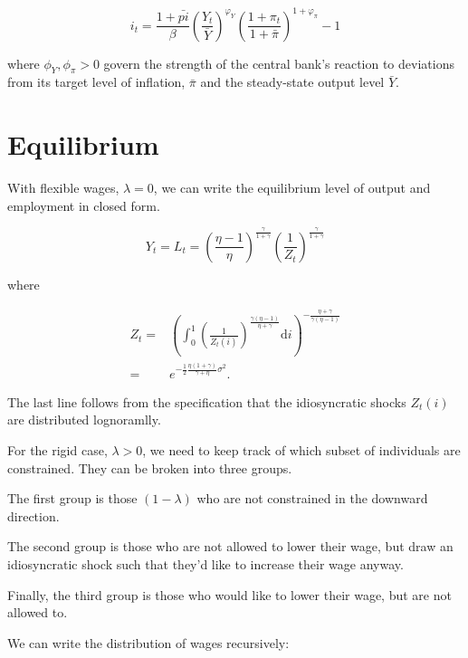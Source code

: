 \documentclass[12pt,a4paper]{scrartcl}            %
\begin{document}
\begin{equation}
    \label{eq:taylor_rule}
    i_t = \frac{1 + \bar{pi}}{\beta} \left( \frac{Y_t}{\bar{Y}} \right)^{\varphi_Y} \left( \frac{1 + \pi_t}{1 + \bar{\pi}} \right)^{1 + \varphi_{\pi}} - 1
\end{equation}

where $\phi_Y, \phi_{\pi} > 0$ govern the strength of the central bank's reaction to deviations from its target level of inflation, $\bar{\pi}$ and the steady-state output level $\bar{Y}$.

\section{Equilibrium}
\label{sec:equilibrium}

With flexible wages, $\lambda = 0$, we can write the equilibrium level of output and employment in closed form.

\begin{equation}
    \label{eq:output_flexible}
    Y_t = L_t = \left( \frac{\eta - 1}{\eta} \right)^{\frac{\gamma}{1 + \gamma}} \left( \frac{1}{Z_t} \right)^{\frac{\gamma}{1 + \gamma}}
\end{equation}

where

\begin{align}
    Z_t =& \left( \int_{0}^{1}\! \left( \frac{1}{Z_t(i)} \right)^{\frac{\gamma(\eta - 1)}{\eta + \gamma}} \mathrm{d}i \right)^{-\frac{\eta + \gamma}{\gamma(\eta - 1)}}\\
        =& e^{-\frac{1}{2} \frac{\eta(1 + \gamma)}{\gamma + \eta}\sigma^2 }.
\end{align}

The last line follows from the specification that the idiosyncratic shocks $Z_t(i)$ are distributed lognoramlly.

For the rigid case, $\lambda > 0$, we need to keep track of which subset of individuals are constrained.
They can be broken into three groups.

The first group is those $(1 - \lambda)$ who are not constrained in the downward direction.

The second group is those who are not allowed to lower their wage, but draw an idiosyncratic shock such that they'd like to increase their wage anyway.

Finally, the third group is those who would like to lower their wage, but are not allowed to.

We can write the distribution of wages recursively:
\end{document}
